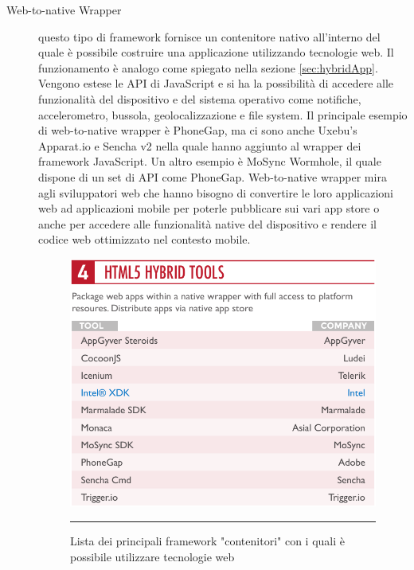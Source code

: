 \begin{description}
\item[Web-to-native Wrapper] questo tipo di framework fornisce un contenitore nativo all'interno del quale è possibile costruire una applicazione utilizzando tecnologie web. Il funzionamento è analogo come spiegato nella sezione \ref{sec:hybridApp}. Vengono estese le API di JavaScript e si ha la possibilità di accedere alle funzionalità del dispositivo e del sistema operativo come notifiche, accelerometro, bussola, geolocalizzazione e file system.
Il principale esempio di web-to-native wrapper è PhoneGap, ma ci sono anche Uxebu’s Apparat.io e Sencha v2 nella quale hanno aggiunto al wrapper dei framework JavaScript. Un altro esempio è MoSync Wormhole, il quale
dispone di un set di API come PhoneGap. Web-to-native wrapper mira agli sviluppatori web che hanno bisogno di convertire le loro applicazioni web ad applicazioni mobile per poterle pubblicare sui vari app store o anche per accedere alle funzionalità native del dispositivo e rendere il codice web ottimizzato nel contesto mobile.

\begin{figure}[htbp]
  \centering
   		\includegraphics[scale=0.6]{Figures/html-hybrid-tools.png} 
    \rule{35em}{0.5pt}
  \caption{Lista dei principali framework "contenitori" con i quali è possibile utilizzare tecnologie web}
  \label{fig:html_hybrid_framework}
\end{figure}


\end{description}
